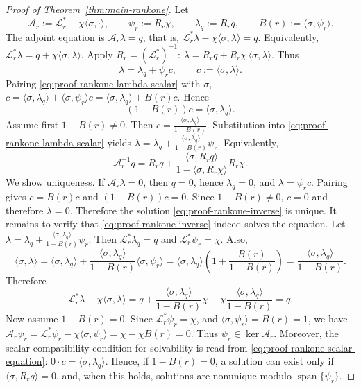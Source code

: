 \documentclass[pdflatex,sn-mathphys-num]{sn-jnl}
\theoremstyle{thmstyleone}
\theoremstyle{definition}
\theoremstyle{remark}
\newcommand{\Lcal}{\mathcal{L}}
\numberwithin{equation}{section}
\begin{document}
\begin{proof}[Proof of Theorem~\ref{thm:main-rankone}]
Let
\[
\mathcal A_r:=\Lcal_r^*-\chi\langle\sigma,\cdot\rangle,
\qquad
\psi_r:=R_r\chi,
\qquad
\lambda_q:=R_rq,
\qquad
B(r):=\langle\sigma,\psi_r\rangle .
\]
The adjoint equation is
$\displaystyle 
\mathcal A_r\lambda=q$,
that is,
$\displaystyle 
\Lcal_r^*\lambda-\chi\langle\sigma,\lambda\rangle=q$.
Equivalently,
$\displaystyle 
\Lcal_r^*\lambda
=
q+\chi\langle\sigma,\lambda\rangle$.
Apply \(R_r=(\Lcal_r^*)^{-1}\):
$\lambda
=
R_rq
+
R_r\chi\,\langle\sigma,\lambda\rangle$.
Thus
\begin{equation}
\label{eq:proof-rankone-lambda-scalar}
\lambda
=
\lambda_q+\psi_r c,
\qquad
c:=\langle\sigma,\lambda\rangle .
\end{equation}
Pairing \eqref{eq:proof-rankone-lambda-scalar} with \(\sigma\),
$\displaystyle 
c
=
\langle\sigma,\lambda_q\rangle
+
\langle\sigma,\psi_r\rangle c
=
\langle\sigma,\lambda_q\rangle+B(r)c$.
Hence
\begin{equation}
\label{eq:proof-rankone-scalar-equation}
(1-B(r))c=\langle\sigma,\lambda_q\rangle .
\end{equation}
Assume first
$\displaystyle 
1-B(r)\ne0$.
Then
$\displaystyle 
c
=
\frac{\langle\sigma,\lambda_q\rangle}{1-B(r)}$.
Substitution into \eqref{eq:proof-rankone-lambda-scalar} yields
$\displaystyle 
\lambda
=
\lambda_q
+
\frac{\langle\sigma,\lambda_q\rangle}{1-B(r)}\psi_r$.
Equivalently,
\begin{equation}
\label{eq:proof-rankone-inverse}
\mathcal A_r^{-1}q
=
R_rq
+
\frac{\langle\sigma,R_rq\rangle}{1-\langle\sigma,R_r\chi\rangle}R_r\chi .
\end{equation}
We show uniqueness. If $\mathcal A_r\lambda=0$,
then \(q=0\), hence \(\lambda_q=0\), and
$\lambda=\psi_r c$. Pairing gives
$c=B(r)c$ and $(1-B(r))c=0$.
Since \(1-B(r)\ne0\),
$c=0$ and therefore $\lambda=0$.
Therefore the solution \eqref{eq:proof-rankone-inverse} is unique.
It remains to verify that \eqref{eq:proof-rankone-inverse} indeed solves the
equation. Let
$\displaystyle 
\lambda
=
\lambda_q
+
\frac{\langle\sigma,\lambda_q\rangle}{1-B(r)}\psi_r$.
Then $\Lcal_r^*\lambda_q=q$ and $\Lcal_r^*\psi_r=\chi$.
Also,
\[ 
\langle\sigma,\lambda\rangle
=
\langle\sigma,\lambda_q\rangle
+
\frac{\langle\sigma,\lambda_q\rangle}{1-B(r)}
\langle\sigma,\psi_r\rangle
=
\langle\sigma,\lambda_q\rangle
\left(
1+\frac{B(r)}{1-B(r)}
\right)
=
\frac{\langle\sigma,\lambda_q\rangle}{1-B(r)}.
\]
Therefore
\[
\Lcal_r^*\lambda-\chi\langle\sigma,\lambda\rangle
=
q
+
\frac{\langle\sigma,\lambda_q\rangle}{1-B(r)}\chi
-
\chi\frac{\langle\sigma,\lambda_q\rangle}{1-B(r)}
=
q.
\]
Now assume
$\displaystyle 
1-B(r)=0$.
Since
$\displaystyle 
\Lcal_r^*\psi_r=\chi$,
and
$\displaystyle 
\langle\sigma,\psi_r\rangle=B(r)=1$,
we have
$\displaystyle 
\mathcal A_r\psi_r
=
\Lcal_r^*\psi_r-\chi\langle\sigma,\psi_r\rangle
=
\chi-\chi B(r)
=
0$.
Thus
$\displaystyle 
\psi_r\in\ker\mathcal A_r$.
Moreover, the scalar compatibility condition for solvability is read from
\eqref{eq:proof-rankone-scalar-equation}:
$\displaystyle 
0\cdot c=\langle\sigma,\lambda_q\rangle$.
Hence, if \(1-B(r)=0\), a solution can exist only if
$\langle\sigma,R_rq\rangle=0$,
and, when this holds, solutions are nonunique modulo
$\displaystyle 
\operatorname{span}\{\psi_r\}$.
\end{proof}
\end{document}
